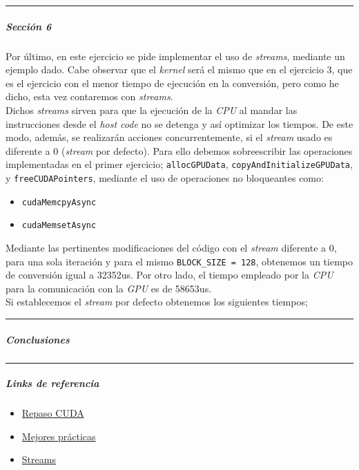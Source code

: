 \documentclass[
]{article}
\begin{document}
\begin{center}\rule{0.5\linewidth}{0.5pt}\end{center}

\hypertarget{secciuxf3n-6}{%
\subparagraph{Sección 6}\label{secciuxf3n-6}}

Por último, en este ejercicio se pide implementar el uso de
\emph{streams}, mediante un ejemplo dado. Cabe observar que el
\emph{kernel} será el mismo que en el ejercicio 3, que es el ejercicio
con el menor tiempo de ejecución en la conversión, pero como he dicho,
esta vez contaremos con \emph{streams}. \\
Dichos \emph{streams} sirven para que la ejecución de la \emph{CPU} al
mandar las instrucciones desde el \emph{host code} no se detenga y así
optimizar los tiempos. De este modo, además, se realizarán acciones
concurrentemente, si el \emph{stream} usado es diferente a 0
(\emph{stream} por defecto). Para ello debemos sobreescribir las
operaciones implementadas en el primer ejercicio; \texttt{allocGPUData},
\texttt{copyAndInitializeGPUData}, y \texttt{freeCUDAPointers}, mediante
el uso de operaciones no bloqueantes como:

\begin{itemize}
\item
  \texttt{cudaMemcpyAsync}
\item
  \texttt{cudaMemsetAsync}
\end{itemize}

Mediante las pertinentes modificaciones del código con el \emph{stream}
diferente a 0, para una sola iteración y para el mismo
\texttt{BLOCK\_SIZE\ =\ 128}, obtenemos un tiempo de conversión igual a
32352us. Por otro lado, el tiempo empleado por la \emph{CPU} para la
comunicación con la \emph{GPU} es de 58653us. \\
Si establecemos el \emph{stream} por defecto obtenemos los siguientes
tiempos;

\begin{center}\rule{0.5\linewidth}{0.5pt}\end{center}

\hypertarget{conclusiones}{%
\subparagraph{Conclusiones}\label{conclusiones}}

\begin{center}\rule{0.5\linewidth}{0.5pt}\end{center}

\hypertarget{links-de-referencia}{%
\subparagraph{Links de referencia}\label{links-de-referencia}}

\begin{itemize}
\item
  \href{https://developer.nvidia.com/blog/cuda-refresher-cuda-programming-model/}{Repaso
  CUDA}
\item
  \href{https://docs.nvidia.com/cuda/cuda-c-best-practices-guide/index.html}{Mejores
  prácticas}
\item
  \href{https://developer.nvidia.com/blog/gpu-pro-tip-cuda-7-streams-simplify-concurrency/}{Streams}
\end{itemize}
\end{document}
